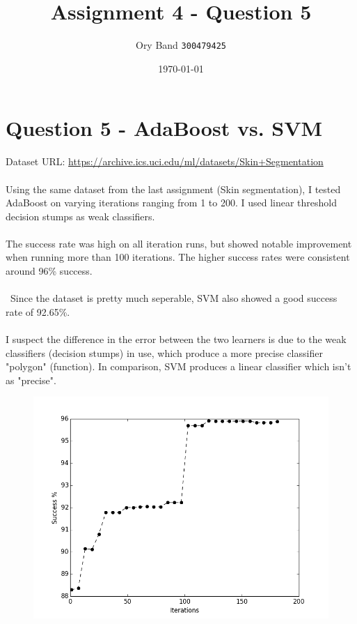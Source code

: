 \documentclass[a4paper]{article}
\title{Assignment 4 - Question 5}
\author{Ory Band \texttt{300479425}}
\date{\today}
\begin{document}
\section {Question 5 - AdaBoost vs. SVM}

Dataset URL: \url{https://archive.ics.uci.edu/ml/datasets/Skin+Segmentation}
\\\\
Using the same dataset from the last assignment (Skin segmentation),
I tested AdaBoost on varying iterations ranging from 1 to 200.
I used linear threshold decision stumps as weak classifiers.
\\\\
The success rate was high on all iteration runs,
but showed notable improvement when running more than 100 iterations.
The higher success rates were consistent around 96\% success.
\\\\\
Since the dataset is pretty much seperable,
SVM also showed a good success rate of 92.65\%.
\\\\
I suspect the difference in the error between the two learners
is due to the weak classifiers (decision stumps) in use,
which produce a more precise classifier "polygon" (function).
In comparison, SVM produces a linear classifier which isn't as "precise".

\begin{figure}[h!]
    \includegraphics[width=1\textwidth]{adaboost_iterations.png}
\end{figure}
\end{document}

